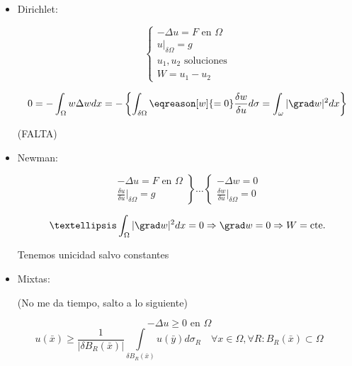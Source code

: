 		\begin{itemize}
			\item Dirichlet:

				\[ \begin{cases}
					-\Delta u = F \text{ en } \Omega \\
					u |_{\delta \Omega} = g \\
					u_1,u_2 \text{ soluciones} \\
					W = u_1 - u_2
				\end{cases} \]

				\[ 0 = - \int_{\Omega} w \Delta w dx = - \left\{  \int_{\delta \Omega} \eqreason[w]{= 0} \frac{\delta w}{\delta u} d\sigma = \int_{\omega}|\grad w|^2 dx \right\}  \]

				(FALTA)

			\item Newman:

				\[ \left. \begin{array}{r}
					-\Delta u = F \text{ en } \Omega \\
					\frac{\delta u}{\delta u}|_{\delta \Omega} = g
					\end{array} \right\} … \left\{ \begin{array}{l}
						- \Delta w = 0 \\
						\frac{\delta w}{\delta u}|_{\delta \Omega} = 0
					\end{array}  \right.  \]

					\[ … \int_{\Omega} |\grad w|^2 dx = 0 \Rightarrow \grad w = 0 \Rightarrow W = \text{cte.}  \]

					Tenemos unicidad salvo constantes

			\item Mixtas:

				(No me da tiempo, salto a lo siguiente)

		\end{itemize}


		\begin{prop}

			\[ - \Delta u \geq 0 \text{ en } \Omega \]
			\[ u (\bar{x}) \geq \frac{1}{|\delta B_R(\bar{x})|} \int\limits_{\delta B_R (\bar{x})} u(\bar{y}) d \sigma_R \quad \forall x \in \Omega, \forall R : B_R(\bar{x}) \subset \Omega \]

		\end{prop}

